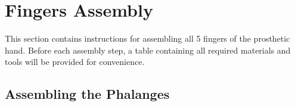 \section{Fingers Assembly}

This section contains instructions for assembling all 5 fingers of the prosthetic hand. Before each assembly step, a table containing all required materials and tools will be provided for convenience.

\subsection{Assembling the Phalanges}


\begin{table}[ht!]
	\centering
	
\end{table}

